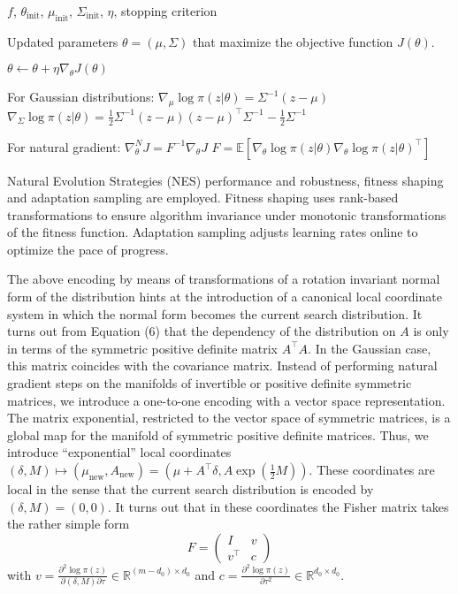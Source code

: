 $f$, $\theta_{\text{init}}$, $\mu_{\text{init}}$, $\Sigma_{\text{init}}$, $\eta$, stopping criterion

Updated parameters $\theta = (\mu, \Sigma)$ that maximize the objective function $J(\theta)$.

$\theta \leftarrow \theta + \eta \nabla_\theta J(\theta)$

For Gaussian distributions:
$\nabla_\mu \log \pi (z | \theta) = \Sigma^{-1} (z - \mu)$
$\nabla_\Sigma \log \pi (z | \theta) = \frac{1}{2} \Sigma^{-1} (z - \mu) (z - \mu)^\top \Sigma^{-1} - \frac{1}{2} \Sigma^{-1}$

For natural gradient:
$\nabla_\theta^N J = F^{-1} \nabla_\theta J$
$F = \mathbb{E} \left[ \nabla_\theta \log \pi (z|\theta) \nabla_\theta \log \pi (z|\theta)^\top \right]$


Natural Evolution Strategies (NES) performance and robustness, fitness shaping and adaptation sampling are employed. Fitness shaping uses rank-based transformations to ensure algorithm invariance under monotonic transformations of the fitness function. Adaptation sampling adjusts learning rates online to optimize the pace of progress. 

The above encoding by means of transformations of a rotation invariant normal form of the distribution hints at the introduction of a canonical local coordinate system in which the normal form becomes the current search distribution. It turns out from Equation (6) that the dependency of the distribution on $A$ is only in terms of the symmetric positive definite matrix $A^\top A$. In the Gaussian case, this matrix coincides with the covariance matrix. Instead of performing natural gradient steps on the manifolds of invertible or positive definite symmetric matrices, we introduce a one-to-one encoding with a vector space representation. The matrix exponential, restricted to the vector space of symmetric matrices, is a global map for the manifold of symmetric positive definite matrices. Thus, we introduce “exponential” local coordinates $(\delta, M) \mapsto (\mu_{\text{new}}, A_{\text{new}}) = (\mu + A^\top \delta, A \exp \left( \frac{1}{2} M \right))$. These coordinates are local in the sense that the current search distribution is encoded by $(\delta, M) = (0, 0)$. It turns out that in these coordinates the Fisher matrix takes the rather simple form
\[
F = \begin{pmatrix}
I & v \\
v^\top & c
\end{pmatrix}
\]
with $v = \frac{\partial^2 \log \pi(z)}{\partial (\delta, M) \partial \tau} \in \mathbb{R}^{(m-d_0) \times d_0}$ and $c = \frac{\partial^2 \log \pi(z)}{\partial \tau^2} \in \mathbb{R}^{d_0 \times d_0}$. 

